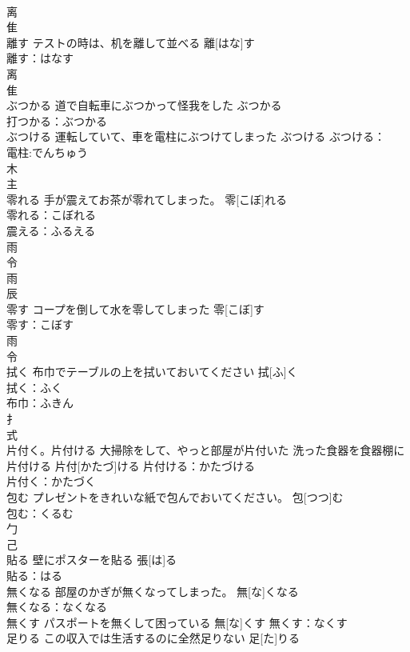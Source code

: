 \documentclass[8pt]{extreport}
\begin{document}
\begin{CJK}{UTF8}{min}
\\	离 
\\	隹 
\\	離す	テストの時は、机を離して並べる	離[はな]す	
\\	離す：はなす
\\	离 
\\	隹 
\\	ぶつかる	道で自転車にぶつかって怪我をした	ぶつかる	
\\	打つかる：ぶつかる
\\	ぶつける	運転していて、車を電柱にぶつけてしまった	ぶつける			ぶつける：
\\	電柱:でんちゅう
\\	木 
\\	主 
\\	零れる	手が震えてお茶が零れてしまった。	零[こぼ]れる	
\\	零れる：こぼれる
\\	震える：ふるえる
\\	雨 
\\	令 
\\	雨 
\\	辰 
\\	零す	コープを倒して水を零してしまった	零[こぼ]す	
\\	零す：こぼす
\\	雨 
\\	令 
\\	拭く	布巾でテーブルの上を拭いておいてください	拭[ふ]く	
\\	拭く：ふく
\\	布巾：ふきん
\\	扌 
\\	式 
\\	片付く。片付ける	大掃除をして、やっと部屋が片付いた 洗った食器を食器棚に片付ける	片付[かたづ]ける			片付ける：かたづける
\\	片付く：かたづく
\\	包む	プレゼントをきれいな紙で包んでおいてください。	包[つつ]む	
\\	包む：くるむ
\\	勹 
\\	己 
\\	貼る	壁にポスターを貼る	張[は]る	
\\	貼る：はる
\\	無くなる	部屋のかぎが無くなってしまった。	無[な]くなる	
\\	無くなる：なくなる
\\	無くす	パスポートを無くして困っている	無[な]くす			無くす：なくす
\\	足りる	この収入では生活するのに全然足りない	足[た]りる	

\end{CJK}
\end{document}
